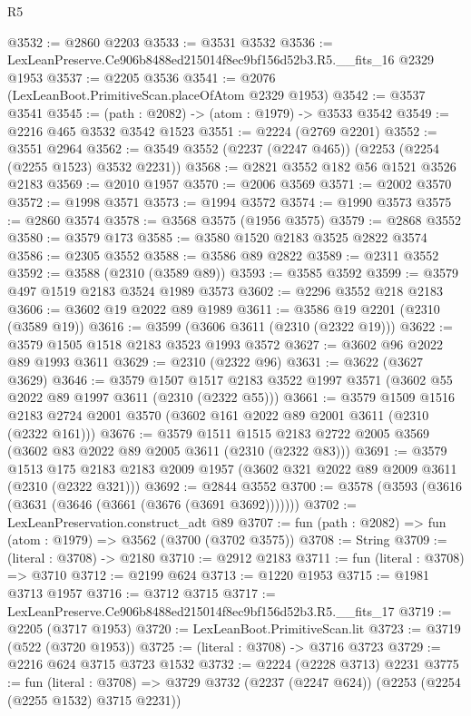\begin{lexlean}{R5}
\begin{coremodule}
@3532 := @2860 @2203
@3533 := @3531 @3532
@3536 := LexLeanPreserve.Ce906b8488ed215014f8ec9bf156d52b3.R5.__fits_16 @2329 @1953
@3537 := @2205 @3536
@3541 := @2076 (LexLeanBoot.PrimitiveScan.placeOfAtom @2329 @1953)
@3542 := @3537 @3541
@3545 := (path : @2082) -> (atom : @1979) -> @3533 @3542
@3549 := @2216 @465 @3532 @3542 @1523
@3551 := @2224 (@2769 @2201)
@3552 := @3551 @2964
@3562 := @3549 @3552 (@2237 (@2247 @465)) (@2253 (@2254 (@2255 @1523) @3532 @2231))
@3568 := @2821 @3552 @182 @56 @1521 @3526 @2183
@3569 := @2010 @1957
@3570 := @2006 @3569
@3571 := @2002 @3570
@3572 := @1998 @3571
@3573 := @1994 @3572
@3574 := @1990 @3573
@3575 := @2860 @3574
@3578 := @3568 @3575 (@1956 @3575)
@3579 := @2868 @3552
@3580 := @3579 @173
@3585 := @3580 @1520 @2183 @3525 @2822 @3574
@3586 := @2305 @3552
@3588 := @3586 @89 @2822
@3589 := @2311 @3552
@3592 := @3588 (@2310 (@3589 @89))
@3593 := @3585 @3592
@3599 := @3579 @497 @1519 @2183 @3524 @1989 @3573
@3602 := @2296 @3552 @218 @2183
@3606 := @3602 @19 @2022 @89 @1989
@3611 := @3586 @19 @2201 (@2310 (@3589 @19))
@3616 := @3599 (@3606 @3611 (@2310 (@2322 @19)))
@3622 := @3579 @1505 @1518 @2183 @3523 @1993 @3572
@3627 := @3602 @96 @2022 @89 @1993 @3611
@3629 := @2310 (@2322 @96)
@3631 := @3622 (@3627 @3629)
@3646 := @3579
    @1507
    @1517
    @2183
    @3522
    @1997
    @3571
    (@3602 @55 @2022 @89 @1997 @3611 (@2310 (@2322 @55)))
@3661 := @3579
    @1509
    @1516
    @2183
    @2724
    @2001
    @3570
    (@3602 @161 @2022 @89 @2001 @3611 (@2310 (@2322 @161)))
@3676 := @3579
    @1511
    @1515
    @2183
    @2722
    @2005
    @3569
    (@3602 @83 @2022 @89 @2005 @3611 (@2310 (@2322 @83)))
@3691 := @3579
    @1513
    @175
    @2183
    @2183
    @2009
    @1957
    (@3602 @321 @2022 @89 @2009 @3611 (@2310 (@2322 @321)))
@3692 := @2844 @3552
@3700 := @3578 (@3593 (@3616 (@3631 (@3646 (@3661 (@3676 (@3691 @3692)))))))
@3702 := LexLeanPreservation.construct_adt @89
@3707 := fun (path : @2082) => fun (atom : @1979) => @3562 (@3700 (@3702 @3575))
@3708 := String
@3709 := (literal : @3708) -> @2180
@3710 := @2912 @2183
@3711 := fun (literal : @3708) => @3710
@3712 := @2199 @624
@3713 := @1220 @1953
@3715 := @1981 @3713 @1957
@3716 := @3712 @3715
@3717 := LexLeanPreserve.Ce906b8488ed215014f8ec9bf156d52b3.R5.__fits_17
@3719 := @2205 (@3717 @1953)
@3720 := LexLeanBoot.PrimitiveScan.lit
@3723 := @3719 (@522 (@3720 @1953))
@3725 := (literal : @3708) -> @3716 @3723
@3729 := @2216 @624 @3715 @3723 @1532
@3732 := @2224 (@2228 @3713) @2231
@3775 := fun (literal : @3708) =>
  @3729
    @3732
    (@2237 (@2247 @624))
    (@2253 (@2254 (@2255 @1532) @3715 @2231))

\end{coremodule}
\end{lexlean}
